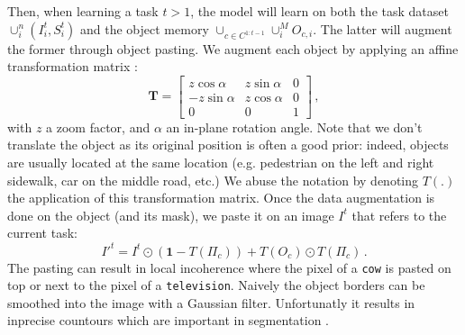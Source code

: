 Then, when learning a task $t > 1$, the model will learn on both the task dataset $\cup_i^n (I^t_i,
    S^t_i)$ and the object memory $\cup_{c \in C^{1:t-1}} \cup_i^M O_{c,i}$. The latter will augment
the former through object pasting. We augment each object by applying an affine transformation
matrix \citep{fang2019instaboost}:
%
\begin{equation}
    \mathbf{T}=\left[\begin{array}{ccc}
            z \cos \alpha  & z \sin \alpha & 0 \\
            -z \sin \alpha & z \cos \alpha & 0 \\
            0              & 0             & 1
        \end{array}\right]\,,
    \label{eq:seg_transformation_matrix_complex}
\end{equation}
%
\noindent with $z$ a zoom factor, and $\alpha$ an in-plane rotation angle. Note that we don't
translate the object as its original position is often a good prior: indeed, objects are usually
located at the same location (e.g. pedestrian on the left and right sidewalk, car on the middle
road, etc.) We abuse the notation by denoting $T(.)$ the application of this transformation matrix.
Once the data augmentation is done on the object (and its mask), we paste it on an image $I^t$ that
refers to the current task:
%
\begin{equation}
    {I'}^t = I^t \odot (\mathbf{1} - T(\Pi_c)) + T(O_c) \odot T(\Pi_c)\,.
    \label{eq:seg_pasting}
\end{equation}
%
The pasting can result in local incoherence where the pixel of a \texttt{cow} is pasted on top or
next to the pixel of a \texttt{television}. Naively the object borders can be smoothed into the
image with a Gaussian filter. Unfortunatly it results in inprecise countours which are important in
segmentation \citep{chen2020semeda}.

